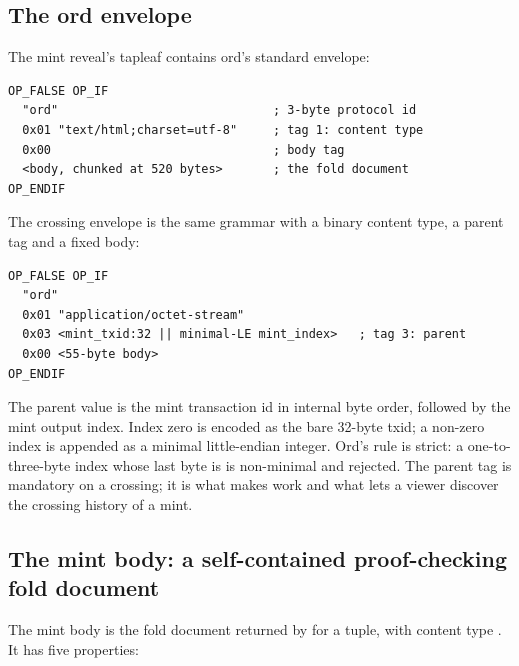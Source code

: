 \subsection{The ord envelope}

The mint reveal's tapleaf contains ord's standard envelope:
\begin{lstlisting}[language={},caption={Mint inscription envelope (grammar).},label={lst:mint-env}]
OP_FALSE OP_IF
  "ord"                              ; 3-byte protocol id
  0x01 "text/html;charset=utf-8"     ; tag 1: content type
  0x00                               ; body tag
  <body, chunked at 520 bytes>       ; the fold document
OP_ENDIF
\end{lstlisting}
The crossing envelope is the same grammar with a binary content type, a
parent tag and a fixed body:
\begin{lstlisting}[language={},caption={Crossing inscription envelope (grammar).},label={lst:cross-env}]
OP_FALSE OP_IF
  "ord"
  0x01 "application/octet-stream"
  0x03 <mint_txid:32 || minimal-LE mint_index>   ; tag 3: parent
  0x00 <55-byte body>
OP_ENDIF
\end{lstlisting}

The parent value is the mint transaction id in internal byte order, followed
by the mint output index. Index zero is encoded as the bare 32-byte txid; a
non-zero index is appended as a minimal little-endian integer. Ord's rule is
strict: a one-to-three-byte index whose last byte is  is
non-minimal and rejected. The parent tag is mandatory on a crossing; it is
what makes  work and what lets a viewer discover the
crossing history of a mint.

\subsection{The mint body: a self-contained proof-checking fold document}

The mint body is the fold document returned by
 for a  tuple, with
content type . It has five properties:

